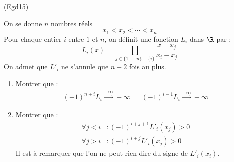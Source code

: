 \begin{tiny}(Egd15)\end{tiny}
On se donne $n$ nombres réels 
\begin{displaymath}
 x_1 < x_2 < \cdots < x_n
\end{displaymath}
Pour chaque entier $i$ entre $1$ et $n$, on définit une fonction $L_i$ dans $\R$ par :
\begin{displaymath}
L_i(x) = \prod_{j\in\{1,\cdots,n\}-\{i\}}\frac{x-x_j}{x_i-x_j} 
\end{displaymath}
On admet que $L'_i$ ne s'annule que $n-2$ fois au plus.
\begin{enumerate}
 \item Montrer que :
\begin{align*}
 (-1)^{n+i}L_i \xrightarrow{+\infty} +\infty & &
 (-1)^{i-1}L_i \xrightarrow{-\infty} +\infty 
\end{align*}
 \item Montrer que :
\begin{align*}
 \forall j<i &: (-1)^{i+j+1}L'_i(x_j) >0 \\
 \forall j>i &: (-1)^{i+j}L'_i(x_j) >0
\end{align*}
Il est à remarquer que l'on ne peut rien dire du signe de $L'_i(x_i)$.
\end{enumerate}
